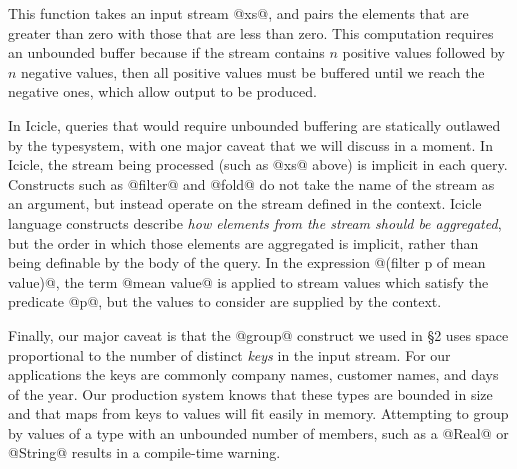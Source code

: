 This function takes an input stream @xs@, and pairs the elements that are greater than zero with those that are less than zero.
This computation requires an unbounded buffer because if the stream contains $n$ positive values followed by $n$ negative values, then all positive values must be buffered until we reach the negative ones, which allow output to be produced.


In Icicle, queries that would require unbounded buffering are statically outlawed by the typesystem, with one major caveat that we will discuss in a moment. In Icicle, the stream being processed (such as @xs@ above) is implicit in each query. Constructs such as @filter@ and @fold@ do not take the name of the stream as an argument, but instead operate on the stream defined in the context. Icicle language constructs describe \emph{how elements from the stream should be aggregated}, but the order in which those elements are aggregated is implicit, rather than being definable by the body of the query. In the expression @(filter p of mean value)@, the term @mean value@ is applied to stream values which satisfy the predicate @p@, but the values to consider are supplied by the context.

Finally, our major caveat is that the @group@ construct we used in \S2 uses space proportional to the number of distinct \emph{keys} in the input stream.
For our applications the keys are commonly company names, customer names, and days of the year.
Our production system knows that these types are bounded in size and that maps from keys to values will fit easily in memory.
Attempting to group by values of a type with an unbounded number of members, such as a @Real@ or @String@ results in a compile-time warning.




